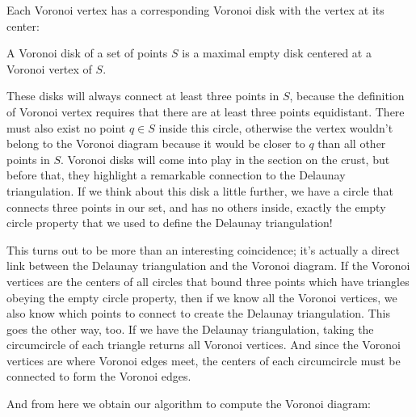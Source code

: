 Each Voronoi vertex has a corresponding Voronoi disk with the vertex at its center:
\begin{definition}
	A Voronoi disk of a set of points $S$ is a maximal empty disk centered at a Voronoi vertex of $S$.
\end{definition}
These disks will always connect at least three points in $S$, because the definition of Voronoi vertex requires that there are at least three points equidistant.
There must also exist no point $q\in S$ inside this circle, otherwise the vertex wouldn't belong to the Voronoi diagram because it would be closer to $q$ than all other points in $S$.
Voronoi disks will come into play in the section on the crust, but before that, they highlight a remarkable connection to the Delaunay triangulation.
If we think about this disk a little further, we have a circle that connects three points in our set, and has no others inside, exactly the empty circle property that we used to define the Delaunay triangulation!

This turns out to be more than an interesting coincidence; it's actually a direct link between the Delaunay triangulation and the Voronoi diagram.
If the Voronoi vertices are the centers of all circles that bound three points which have triangles obeying the empty circle property, then if we know all the Voronoi vertices, we also know which points to connect to create the Delaunay triangulation.
This goes the other way, too.
If we have the Delaunay triangulation, taking the circumcircle of each triangle returns all Voronoi vertices.
And since the Voronoi vertices are where Voronoi edges meet, the centers of each circumcircle must be connected to form the Voronoi edges.

And from here we obtain our algorithm to compute the Voronoi diagram:

\begin{algorithm}
\end{algorithm}

